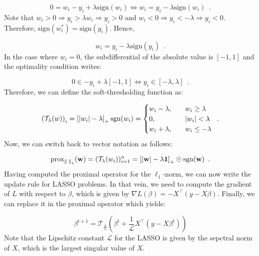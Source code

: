 \documentclass[a4paper,10pt]{article}
\theoremstyle{definition}
\begin{document}
\begin{equation*}
    0 = w_i - y_i + \lambda \text{sign}(w_i)
    \iff w_i = y_i - \lambda \text{sign}(w_i)
    \enspace .
\end{equation*}
%
Note that $w_i > 0 \Rightarrow y_i > \lambda w_i \Rightarrow y_i > 0$ and 
$w_i < 0 \Rightarrow y_i < -\lambda \Rightarrow y_i < 0$. Therefore, $\text{sign}(w_i^*) = \text{sign}(y_i)$.
Hence, 

\begin{equation*}
    w_i = y_i - \lambda \text{sign}(y_i)
    \enspace .
\end{equation*}
%
In the case where $w_i = 0$, the subdifferential of the absolute value is $[-1, 1]$
and the optimality condition writes:

\begin{equation*}
    0 \in -y_i + \lambda [-1, 1] 
    \iff y_i \in [-\lambda, \lambda]
    \enspace .
\end{equation*}
%
Therefore, we can define the soft-thresholding function as:

\begin{equation*}
    \left(\mathcal{T}_{\lambda}(w)\right)_i = \left[\lvert w_i \rvert - \lambda\right]_+ \text{sgn}(w_i)
    = 
    \begin{cases}
        w_i - \lambda,  \quad &w_i \geq \lambda \\
        0, \quad & \lvert w_i \rvert < \lambda \\
        w_i + \lambda, \quad &w_i \leq -\lambda
    \end{cases}
    \enspace .
\end{equation*}
%
Now, we can switch back to vector notation as follows:

\begin{equation*}
    \text{prox}_{\left \lVert \cdot \right \rVert_1}(\mathbf{w}) = (\mathcal{T}_{\lambda}(w_i))_{i=1}^n
    = \left[\lvert \mathbf{w} \rvert - \lambda \mathbf{1}\right]_+ \odot \text{sgn}(\mathbf{w})
    \enspace .
\end{equation*}
%
Having computed the proximal operator for the $\ell_1$-norm, we can now write the update
rule for LASSO problems. In that vein, we need to compute the gradient of $L$ with respect 
to $\beta$, which is given by $\nabla L(\beta) = -X^{\top}(y-X\beta)$. Finally, we can replace 
it in the proximal operator which yields:

\begin{equation*}
    \beta^{t+1} = \mathcal{T}_{\frac{\lambda}{\mathcal{L}}}\left(
        \beta^{t} + \frac{1}{\mathcal{L}} X^{\top}(y-X\beta^t)
    \right)
\end{equation*}
%
Note that the Lipschitz constant $\mathcal{L}$ for the LASSO is given by the sepctral norm
of $X$, which is the largest singular value of $X$. 
\end{document}
